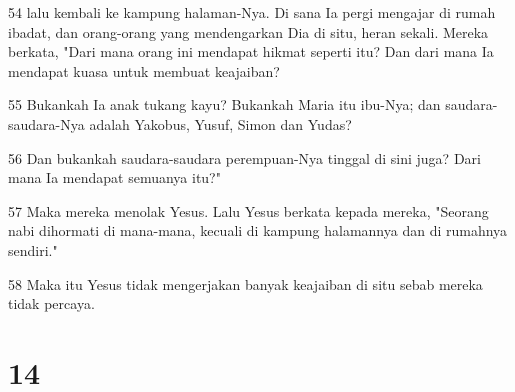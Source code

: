 \par 54 lalu kembali ke kampung halaman-Nya. Di sana Ia pergi mengajar di rumah ibadat, dan orang-orang yang mendengarkan Dia di situ, heran sekali. Mereka berkata, "Dari mana orang ini mendapat hikmat seperti itu? Dan dari mana Ia mendapat kuasa untuk membuat keajaiban?
\par 55 Bukankah Ia anak tukang kayu? Bukankah Maria itu ibu-Nya; dan saudara-saudara-Nya adalah Yakobus, Yusuf, Simon dan Yudas?
\par 56 Dan bukankah saudara-saudara perempuan-Nya tinggal di sini juga? Dari mana Ia mendapat semuanya itu?"
\par 57 Maka mereka menolak Yesus. Lalu Yesus berkata kepada mereka, "Seorang nabi dihormati di mana-mana, kecuali di kampung halamannya dan di rumahnya sendiri."
\par 58 Maka itu Yesus tidak mengerjakan banyak keajaiban di situ sebab mereka tidak percaya.

\chapter{14}

